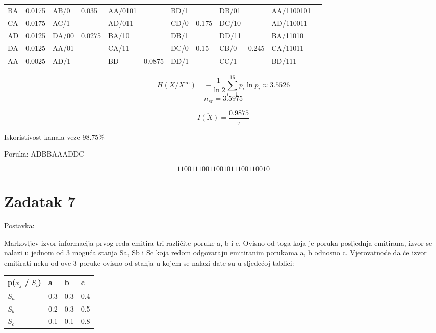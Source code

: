 \documentclass[12pt]{article}
\begin{document}
\begin{table}[hp]
\begin{tabular}{|l|l|l|l|l|l|l|l|l|l|l|l|}
BA & 0.0175 & AB/0 & \multirow{2}{*}{0.035} & AA/0101 &  & BD/1 &  & DB/01 &  & AA/1100101 &  \\ \cline{1-2} \cline{7-8}
CA & 0.0175 & AC/1 &  & AD/011 &  & CD/0 & \multirow{2}{*}{0.175} & DC/10 &  & AD/110011 &  \\ \cline{1-4}
AD & 0.0125 & DA/00 & \multirow{3}{*}{0.0275} & BA/10 &  & DB/1 &  & DD/11 &  & BA/11010 &  \\ \cline{1-2} \cline{7-10}
DA & 0.0125 & AA/01 &  & CA/11 &  & DC/0 & \multirow{2}{*}{0.15} & CB/0 & \multirow{2}{*}{0.245} & CA/11011 &  \\ \cline{1-2} \cline{5-6} \cline{9-9}
AA & 0.0025 & AD/1 &  & BD & 0.0875 & DD/1 &  & CC/1 &  & BD/111 &  \\ \hline
\end{tabular}
\end{table}

$$H(X/X^{\infty}) = - \frac{1}{\ln{2}} \sum_{i = 1}^{16} p_i \ln{p_i} \approx 3.5526$$
$$n_{sr} = 3.5975$$

$$\overline{I(X)} = \frac{0.9875}{\tau}$$

Iskoristivost kanala veze 98.75\%

Poruka: ADBBAAADDC

$$11001110011001011100110010$$

\newpage

\section*{Zadatak 7\label{Z7}}

\underline{Postavka:}

Markovljev izvor informacija prvog reda emitira tri različite poruke a, b i c. Ovisno od toga koja je poruka posljednja emitirana, izvor se nalazi u jednom od 3 moguća stanja Sa, Sb i Sc koja redom odgovaraju emitiranim porukama a, b odnosno c. Vjerovatnoće da će izvor emitirati neku od ove 3 poruke ovisno od stanja u kojem se nalazi date su u sljedećoj tablici: 

\begin{table}[hp]
\centering
\begin{tabular}{|l|l|l|l|}
\hline
p($x_j$ / $S_i$) & a & b & c \\ \hline
$S_a$ & 0.3 & 0.3 & 0.4 \\ \hline
$S_b$ & 0.2 & 0.3 & 0.5 \\ \hline
$S_c$ & 0.1 & 0.1 & 0.8 \\ \hline
\end{tabular}
\end{table}
\end{document}
